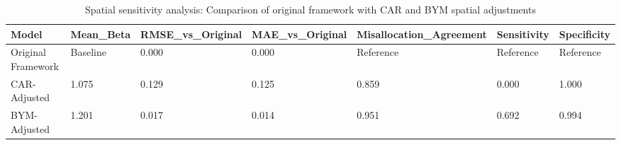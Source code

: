 \begin{table}
\caption{Spatial sensitivity analysis: Comparison of original framework with CAR and BYM spatial adjustments}
\label{tab:spatial_sensitivity}
\begin{tabular}{lllllll}
\toprule
Model & Mean_Beta & RMSE_vs_Original & MAE_vs_Original & Misallocation_Agreement & Sensitivity & Specificity \\
\midrule
Original Framework & Baseline & 0.000 & 0.000 & Reference & Reference & Reference \\
CAR-Adjusted & 1.075 & 0.129 & 0.125 & 0.859 & 0.000 & 1.000 \\
BYM-Adjusted & 1.201 & 0.017 & 0.014 & 0.951 & 0.692 & 0.994 \\
\bottomrule
\end{tabular}
\end{table}
